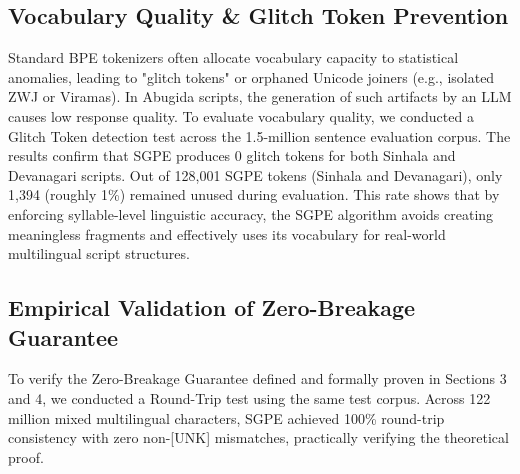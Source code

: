 \subsection{Vocabulary Quality \& Glitch Token Prevention}
Standard BPE tokenizers often allocate vocabulary capacity to statistical anomalies, leading to "glitch tokens" or orphaned Unicode joiners (e.g., isolated ZWJ or Viramas). In Abugida scripts, the generation of such artifacts by an LLM causes low response quality. To evaluate vocabulary quality, we conducted a Glitch Token detection test across the 1.5-million sentence evaluation corpus.
The results confirm that SGPE produces 0 glitch tokens for both Sinhala and Devanagari scripts. Out of 128,001 SGPE tokens (Sinhala and Devanagari), only 1,394 (roughly 1\%) remained unused during evaluation. This rate shows that by enforcing syllable-level linguistic accuracy, the SGPE algorithm avoids creating meaningless fragments and effectively uses its vocabulary for real-world multilingual script structures.

\subsection{Empirical Validation of Zero-Breakage Guarantee}
To verify the Zero-Breakage Guarantee defined and formally proven in Sections 3 and 4, we conducted a Round-Trip test using the same test corpus. Across 122 million mixed multilingual characters, SGPE achieved 100\% round-trip consistency with zero non-[UNK] mismatches, practically verifying the theoretical proof.
